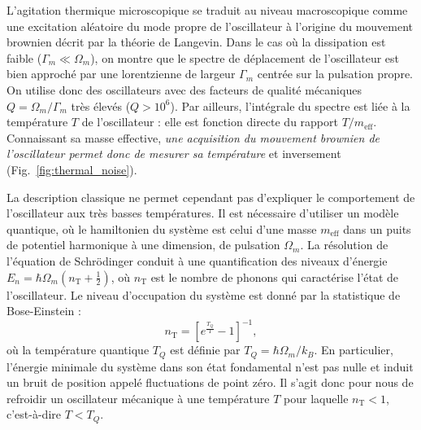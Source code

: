\documentclass[12pt,a4paper]{article}
\begin{document}
L'agitation thermique microscopique se traduit au niveau macroscopique comme une excitation aléatoire du mode propre de l'oscillateur à l'origine du mouvement brownien décrit par la théorie de Langevin.
Dans le cas où la dissipation est faible ($\Gamma_m \ll \Omega_m$), on montre que le spectre de déplacement de l'oscillateur est bien approché par une lorentzienne de largeur $\Gamma_m$ centrée sur la pulsation propre.
On utilise donc des oscillateurs avec des facteurs de qualité mécaniques $Q=\Omega_m/\Gamma_m$ très élevés ($Q>10^6$).
Par ailleurs, l'intégrale du spectre est liée à la température $T$ de l'oscillateur : elle est fonction directe du rapport $T/m_\mathrm{eff}$.
Connaissant sa masse effective, \textit{une acquisition du mouvement brownien de l'oscillateur permet donc de mesurer sa température} et inversement (Fig.~\ref{fig:thermal_noise}).

La description classique ne permet cependant pas d'expliquer le comportement de l'oscillateur aux très basses températures.
Il est nécessaire d'utiliser un modèle quantique, où le hamiltonien du système est celui d'une masse $m_\mathrm{eff}$ dans un puits de potentiel harmonique à une dimension, de pulsation $\Omega_m$.
La résolution de l'équation de Schrödinger conduit à une quantification des niveaux d'énergie $E_n = \hbar\Omega_m (n_\mathrm{T}+\frac{1}{2})$, où $n_\mathrm{T}$ est le nombre de phonons qui caractérise l'état de l'oscillateur.
Le niveau d'occupation du système est donné par la statistique de Bose-Einstein :
\begin{equation}
n_\mathrm{T} = \left[ e^\frac{T_Q}{T} -1\right]^{-1},
\label{eq:phonon_number}
\end{equation}
où la température quantique $T_Q$ est définie par $T_Q = \hbar\Omega_m/k_B$.
En particulier, l'énergie minimale du système dans son état fondamental n'est pas nulle et induit un bruit de position appelé \og fluctuations de point zéro\fg{}.
Il s'agit donc pour nous de refroidir un oscillateur mécanique à une température $T$ pour laquelle $n_\mathrm{T}<1$, c'est-à-dire $T<T_Q$.
\end{document}
